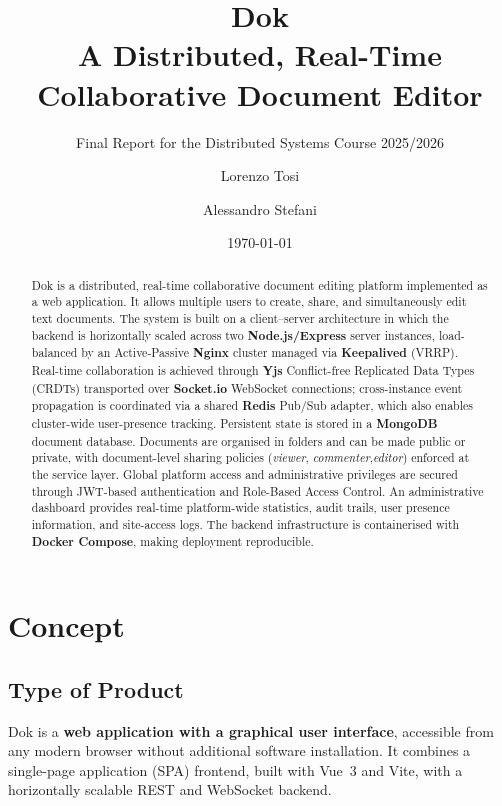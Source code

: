 \documentclass{scrartcl}
\title{\LARGE
Dok \\
\large A Distributed, Real-Time Collaborative Document Editor
}
\subtitle{Final Report for the Distributed Systems Course 2025/2026}
\author{
  Lorenzo Tosi \\ \emailaddr{lorenzo.tosi10@studio.unibo.it}
  \and
  Alessandro Stefani \\ \emailaddr{alessandro.stefani10@studio.unibo.it}
}
\date{\today}
\begin{document}
  \maketitle

  \begin{abstract}
    Dok is a distributed, real-time collaborative document editing platform implemented as a web application.
    It allows multiple users to create, share, and simultaneously edit text documents.
    The system is built on a client--server architecture in which the backend is horizontally scaled across
    two \textbf{Node.js/Express} server instances, load-balanced by an Active-Passive \textbf{Nginx} cluster managed
    via \textbf{Keepalived} (VRRP).
    Real-time collaboration is achieved through
    \textbf{Yjs} Conflict-free Replicated Data Types (CRDTs) transported over \textbf{Socket.io}
    WebSocket connections; cross-instance event propagation is coordinated via a shared \textbf{Redis}
    Pub/Sub adapter, which also enables cluster-wide user-presence tracking.
    Persistent state is stored in a \textbf{MongoDB} document database.
    Documents are organised in folders and can be made public or private, with document-level
    sharing policies (\textit{viewer}, \textit{commenter},\textit{editor}) enforced at the service layer.
    Global platform access and administrative privileges are secured through JWT-based authentication and Role-Based Access Control.
    An administrative dashboard provides real-time platform-wide statistics, audit trails, user presence information, and site-access logs.
    The backend infrastructure is containerised with \textbf{Docker Compose}, making deployment reproducible.
  \end{abstract}

  \section{Concept}\label{concept}

  \subsection{Type of Product}

  Dok is a \textbf{web application with a graphical user interface}, accessible from any modern
  browser without additional software installation.
  It combines a single-page application (SPA) frontend, built with Vue~3 and Vite, with a horizontally scalable REST and WebSocket backend.
\end{document}
